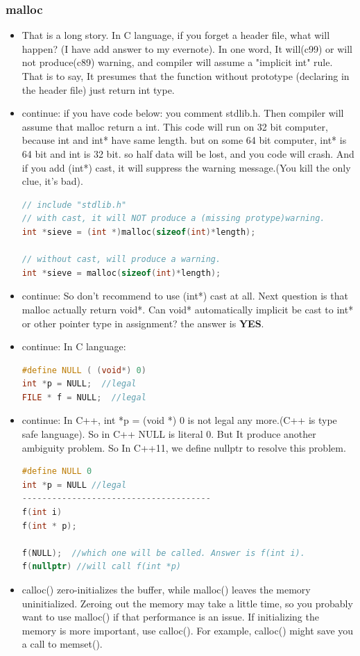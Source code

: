 \documentclass[a4paper,12pt,twoside]{book}
\begin{document}
\subsubsection{malloc}
\begin{itemize}
\item That is a long story. In C language, if you forget a header file, what will happen? (I have add answer to my evernote). In one word, It will(c99) or will not produce(c89) warning, and compiler will assume a "implicit int" rule. That is to say, It presumes that the function without prototype (declaring in the header file) just return int type.

\item continue: if you have code below: you comment stdlib.h. Then compiler will assume that malloc return a int.  This code will run on 32 bit computer, because int and int* have same length. but on some 64 bit computer, int* is 64 bit and int is 32 bit.  so half data will be lost, and you code will crash.
And if you add (int*) cast, it will suppress the warning message.(You kill the only clue, it's bad).
 \begin{lstlisting}[frame=single, language=c++]
 // include "stdlib.h"
// with cast, it will NOT produce a (missing protype)warning.
int *sieve = (int *)malloc(sizeof(int)*length);

// without cast, will produce a warning.
int *sieve = malloc(sizeof(int)*length);
\end{lstlisting}

\item continue: So don't recommend to use (int*) cast at all. Next question is that malloc actually return void*. Can void* automatically implicit be cast to int* or other pointer type in assignment? the answer is \textbf{YES}.

\item  continue: In C language:
 \begin{lstlisting}[frame=single, language=c++]
#define NULL ( (void*) 0)
int *p = NULL;  //legal
FILE * f = NULL;  //legal
\end{lstlisting}

\item continue: In C++, int *p = (void *) 0 is not legal any more.(C++ is type safe language).  So in C++ NULL is literal 0. But It produce another ambiguity problem.  So In C++11, we define nullptr to resolve this problem.
 \begin{lstlisting}[frame=single, language=c++]
#define NULL 0
int *p = NULL //legal
--------------------------------------
f(int i)
f(int * p);

f(NULL);  //which one will be called. Answer is f(int i).
f(nullptr) //will call f(int *p)
\end{lstlisting}


\item calloc() zero-initializes the buffer, while malloc() leaves the memory uninitialized. Zeroing out the memory may take a little time, so you probably want to use malloc() if that performance is an issue. If initializing the memory is more important, use calloc(). For example, calloc() might save you a call to memset().

\end{itemize}
\end{document}
